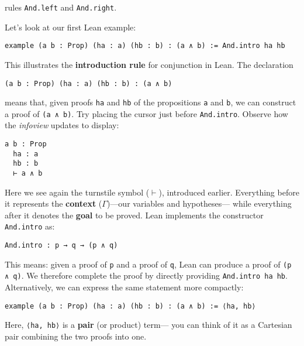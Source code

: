 rules \lstinline[language=lean]|And.left| and \lstinline[language=lean]|And.right|.
\begin{example}\label{ex:conj_intro}
Let's look at our first Lean example:
\begin{lstlisting}[language=lean]
  example (a b : Prop) (ha : a) (hb : b) : (a ∧ b) := And.intro ha hb
\end{lstlisting}
This illustrates the \textbf{introduction rule} for conjunction in Lean.  
The declaration
\begin{lstlisting}[language=lean]
  (a b : Prop) (ha : a) (hb : b) : (a ∧ b)
\end{lstlisting}
means that, given proofs \lstinline[language=lean]|ha| and \lstinline[language=lean]|hb|
of the propositions \lstinline[language=lean]|a| and \lstinline[language=lean]|b|,
we can construct a proof of \lstinline[language=lean]|(a ∧ b)|.
Try placing the cursor just before \lstinline[language=lean]|And.intro|.
Observe how the \textit{infoview} updates to display:
\begin{lstlisting}[language=lean]
  a b : Prop
  ha : a
  hb : b
  ⊢ a ∧ b
\end{lstlisting}
Here we see again the turnstile symbol (\(\vdash\)), introduced earlier.
Everything before it represents the \textbf{context} (\(\Gamma\))—our variables and hypotheses—
while everything after it denotes the \textbf{goal} to be proved.
Lean implements the constructor \lstinline[language=lean]|And.intro| as:
\begin{lstlisting}[language=lean]
  And.intro : p → q → (p ∧ q)
\end{lstlisting}
This means: given a proof of \lstinline[language=lean]|p| and a proof of
\lstinline[language=lean]|q|, Lean can produce a proof of
\lstinline[language=lean]|(p ∧ q)|.
We therefore complete the proof by directly providing
\lstinline[language=lean]|And.intro ha hb|.
Alternatively, we can express the same statement more compactly:
\begin{lstlisting}[language=lean]
  example (a b : Prop) (ha : a) (hb : b) : (a ∧ b) := ⟨ha, hb⟩
\end{lstlisting}
Here, \lstinline[language=lean]|⟨ha, hb⟩| is a \textbf{pair} (or product) term—
you can think of it as a Cartesian pair combining the two proofs into one.
\end{example}

